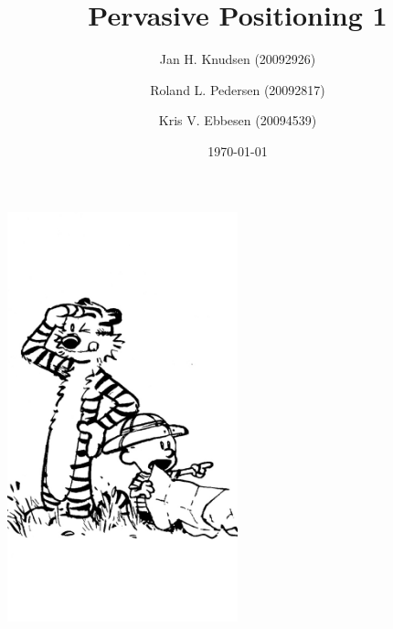 \documentclass[a4paper, 12pt]{article}
\title{Pervasive Positioning 1}
\date{\today}
\author{Jan H. Knudsen (20092926)
\and
Roland L. Pedersen (20092817)
\and
Kris V. Ebbesen (20094539)
}
\begin{document}
\maketitle
\begin{center}
	\includegraphics[width=0.5\textwidth]{front.png}
\end{center}
\newpage
\tableofcontents
\newpage













 
\end{document}
